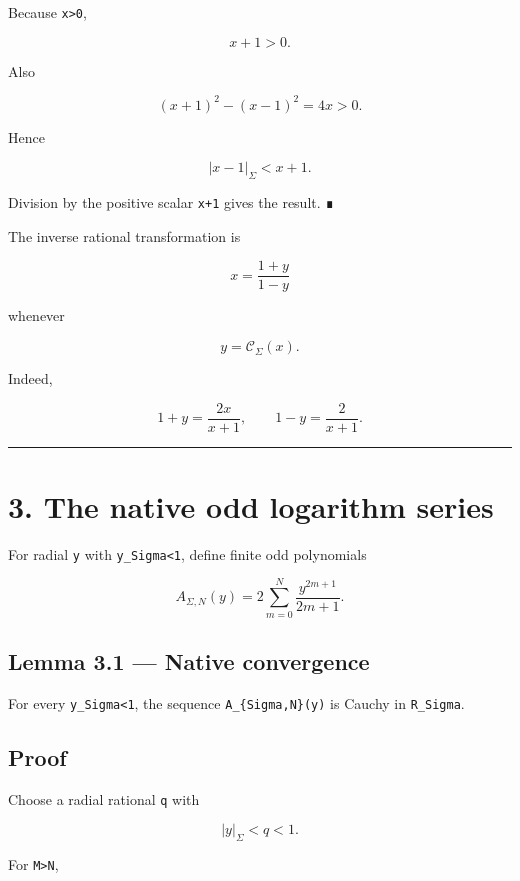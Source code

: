 Because \texttt{x\textgreater{}0},

\[
x+1>0.
\]

Also

\[
(x+1)^2-(x-1)^2=4x>0.
\]

Hence

\[
|x-1|_\Sigma<x+1.
\]

Division by the positive scalar \texttt{x+1} gives the result. ∎

The inverse rational transformation is

\[
\boxed{
x=\frac{1+y}{1-y}}
\]

whenever

\[
y=\mathcal C_\Sigma(x).
\]

Indeed,

\[
1+y=\frac{2x}{x+1},
\qquad
1-y=\frac{2}{x+1}.
\]

\begin{center}\rule{0.5\linewidth}{0.5pt}\end{center}

\hypertarget{the-native-odd-logarithm-series}{%
\section{3. The native odd logarithm series}\label{the-native-odd-logarithm-series}}

For radial \texttt{y} with \texttt{\textbar{}y\textbar{}\_Sigma\textless{}1}, define finite odd polynomials

\[
A_{\Sigma,N}(y)
=
2\sum_{m=0}^{N}
\frac{y^{2m+1}}{2m+1}.
\]

\hypertarget{lemma-3.1-native-convergence}{%
\subsection{Lemma 3.1 --- Native convergence}\label{lemma-3.1-native-convergence}}

For every \texttt{\textbar{}y\textbar{}\_Sigma\textless{}1}, the sequence \texttt{A\_\{Sigma,N\}(y)} is Cauchy in
\texttt{R\_Sigma}.

\hypertarget{proof-1}{%
\subsection{Proof}\label{proof-1}}

Choose a radial rational \texttt{q} with

\[
|y|_\Sigma<q<1.
\]

For \texttt{M\textgreater{}N},

